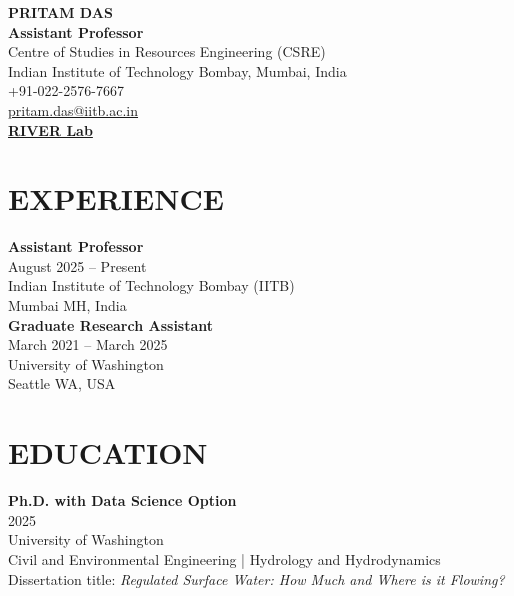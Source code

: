 \documentclass[a4paper,9pt]{extarticle}
\begin{document}
\pagestyle{empty}

\begin{center}
    \textbf{\Large PRITAM DAS}\\[3pt] %
    \textbf{Assistant Professor} \\
    Centre of Studies in Resources Engineering (CSRE)\\
    Indian Institute of Technology Bombay, Mumbai, India\\
        +91-022-2576-7667 \\    
    \href{mailto:pritam.das@iitb.ac.in}{pritam.das@iitb.ac.in} \\ %
    
    \textbf{\href{https://riverlab.in}{RIVER Lab}}\\[1pt] %
    
\end{center}

\section*{EXPERIENCE}
    \noindent
    \newline
    \textbf{Assistant Professor} \\
    August 2025 -- Present \\
    Indian Institute of Technology Bombay (IITB) \\
    Mumbai MH, India \\

    \noindent
    \textbf{Graduate Research Assistant} \\
    March 2021 -- March 2025 \\
    University of Washington \\
    Seattle WA, USA

\section*{EDUCATION}
    \noindent
    \newline
    \textbf{Ph.D. with Data Science Option} \\
    2025 \\
    University of Washington \\
    Civil and Environmental Engineering | Hydrology and Hydrodynamics \\
    Dissertation title: \textit{Regulated Surface Water: How Much and Where is it Flowing?} \\
\end{document}
